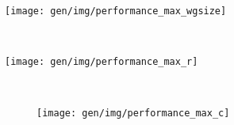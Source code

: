 \begin{subfigure}[h]{\textwidth}
\centering
\texttt{[image: gen/img/performance\_max\_wgsize]}
\vspace{-1.5em} %
\caption{}
\label{fig:performance-max-wgsize}
\end{subfigure}
\\
\begin{subfigure}[h]{.48\textwidth}
\centering
\texttt{[image: gen/img/performance\_max\_r]}
\vspace{-1.5em} %
\caption{}
\label{fig:performance-wg-r}
~%
\begin{subfigure}[h]{.48\textwidth}
\centering
\texttt{[image: gen/img/performance\_max\_c]}
\vspace{-1.5em} %
\caption{}
\label{fig:performance-wg-c}
\end{subfigure}
\end{subfigure}
